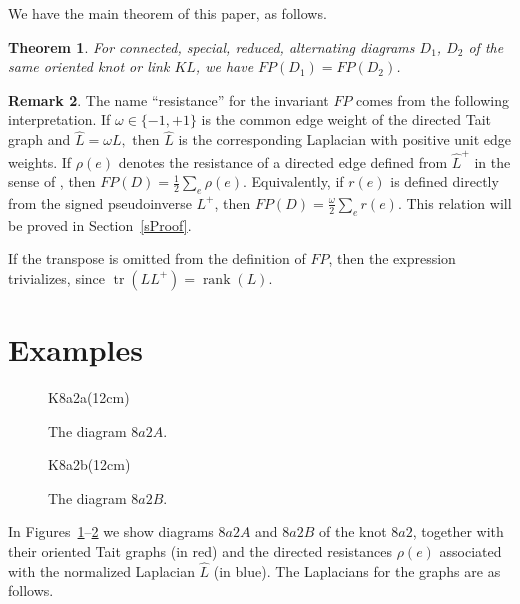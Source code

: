 \documentclass[a4paper,12pt]{amsart}
\numberwithin{equation}{section}
\theoremstyle{plain}
\newtheorem{theorem}{Theorem}[section]
\theoremstyle{definition}
\newtheorem{remark}[theorem]{Remark}
\begin{document}
We have the main theorem of this paper, as follows.

\begin{theorem}\label{thm:main}
	For connected, special, reduced, alternating diagrams $D_1$, $D_2$ of the same oriented knot or link $KL$, we have $FP(D_1)=FP(D_2)$.
\end{theorem}

\begin{remark}
	The name ``resistance'' for the invariant $FP$ comes from the
	following interpretation. If $\omega\in\{-1,+1\}$ is the common
	edge weight of the directed Tait graph and
	$
	\widehat L=\omega L,
	$
	then $\widehat L$ is the corresponding Laplacian with positive unit
	edge weights. If $\rho(e)$ denotes the resistance of a directed edge
	defined from $\widehat L^+$ in the sense of \cite{BBG23}, then
	$
	FP(D)=\frac{1}{2}\sum_e \rho(e).
	$
	Equivalently, if $r(e)$ is defined directly from the signed
	pseudoinverse $L^+$, then
	$
	FP(D)=\frac{\omega}{2}\sum_e r(e).
	$
	This relation will be proved in Section~\ref{sProof}.
	
	If the transpose is omitted from the definition of $FP$, then the
	expression trivializes, since
	$
	\operatorname{tr}(LL^+)=\operatorname{rank}(L).
	$
\end{remark}



\section{Examples}\label{sExamples}


	\begin{figure}[h!t]
	\begin{center}
		\begin{lpic}[]{K8a2a(12cm)}
		\end{lpic}
		\caption{The diagram $8a2A$.\label{K8a2a}}
	\end{center}
\end{figure}


\begin{figure}[h!t]
	\begin{center}
		\begin{lpic}[]{K8a2b(12cm)}
		\end{lpic}
		\caption{The diagram $8a2B$.\label{K8a2b}}
	\end{center}
\end{figure}

In Figures~\ref{K8a2a}--\ref{K8a2b} we show diagrams $8a2A$ and
$8a2B$ of the knot $8a2$, together with their oriented Tait graphs
(in red) and the directed resistances $\rho(e)$ associated with the
normalized Laplacian $\widehat L$ (in blue). The Laplacians for the graphs are as follows.
\end{document}
